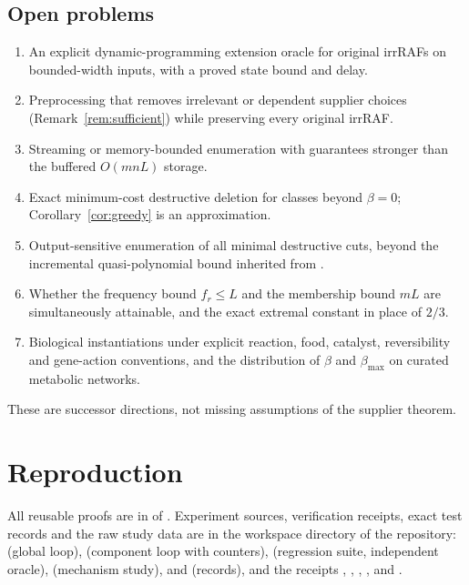 \documentclass[11pt,a4paper]{article}
\theoremstyle{plain}
\theoremstyle{definition}
\theoremstyle{remark}
\newcommand{\bmax}{\beta_{\max}}
\begin{document}
\subsection{Open problems}

\begin{enumerate}[label=\textup{(\arabic*)}]
\item An explicit dynamic-programming extension oracle for original irrRAFs on bounded-width inputs, with a proved state bound and delay.
\item Preprocessing that removes irrelevant or dependent supplier choices (Remark~\ref{rem:sufficient}) while preserving every original irrRAF.
\item Streaming or memory-bounded enumeration with guarantees stronger than the buffered $O(mnL)$ storage.
\item Exact minimum-cost destructive deletion for classes beyond $\beta=0$; Corollary~\ref{cor:greedy} is an approximation.
\item Output-sensitive enumeration of all minimal destructive cuts, beyond the incremental quasi-polynomial bound inherited from \cite{fredman1996complexity}.
\item Whether the frequency bound $f_r\le L$ and the membership bound $mL$ are simultaneously attainable, and the exact extremal constant in place of $2/3$.
\item Biological instantiations under explicit reaction, food, catalyst, reversibility and gene-action conventions, and the distribution of $\beta$ and $\bmax$ on curated metabolic networks.
\end{enumerate}
These are successor directions, not missing assumptions of the supplier theorem.

\appendix
\section{Reproduction}\label{app:repro}

All reusable proofs are in  of \cite{repository2026}. Experiment sources, verification receipts, exact test records and the raw study data are in the workspace directory \allowbreak{} of the repository:  (global loop),  (component loop with counters),  (regression suite, independent oracle),  (mechanism study),  and  (records), and the receipts , , , ,  and .
\end{document}
